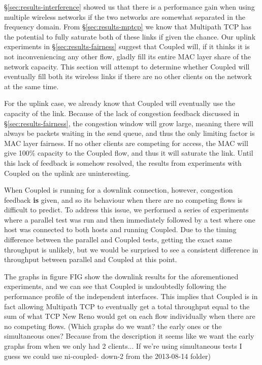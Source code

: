 \S\ref{sec:results-interference} showed us that there is a performance
gain when using multiple wireless networks if the two networks are somewhat 
separated in the frequency domain. From \S\ref{sec:results-mptcp} we know that 
Multipath TCP has the potential to fully saturate both of these links if given 
the chance. Our uplink experiments in \S\ref{sec:results-fairness} suggest that 
Coupled will, if it thinks it is not inconveniencing any other flow, gladly fill 
its entire MAC layer share of the network capacity. This section will attempt to 
determine whether Coupled will eventually fill both its wireless links if there 
are no other clients on the network at the same time.

For the uplink case, we already know that Coupled will eventually use the
capacity of the link. Because of the lack of congestion feedback discussed in
\S\ref{sec:results-fairness}, the congestion window will grow large,
meaning there will always be packets waiting in the send queue, and thus the
only limiting factor is MAC layer fairness. If no other clients are competing
for access, the MAC will give 100\% capacity to the Coupled flow, and thus it
will saturate the link. Until this lack of feedback is somehow resolved, the 
results from experiments with Coupled on the uplink are uninteresting. %

When Coupled is running for a downlink connection, however, congestion feedback
\textbf{is} given, and so its behaviour when there are no competing flows is 
difficult to predict. To address this issue, we performed a series of 
experiments where a parallel test was run and then immediately followed by a 
test where one host was connected to both hosts and running Coupled. Due to the 
timing difference between the parallel and Coupled tests, getting the exact same 
throughput is unlikely, but we would be surprised to see a consistent difference 
in throughput between parallel and Coupled at this point.

The graphs in figure FIG show the downlink results for the aforementioned
experiments, and we can see that Coupled is undoubtedly following the
performance profile of the independent interfaces. This implies that Coupled is
in fact allowing Multipath TCP to eventually get a total throughput equal to the
sum of what TCP New Reno would get on each flow individually when there are no
competing flows. 
(Which graphs do we want? the early ones or the simultaneous ones? Because from 
the description it seems like we want the early graphs from when we only had 2 
clients... If we're using simultaneous tests I guess we could use ni-coupled-
down-2 from the  2013-08-14 folder)
